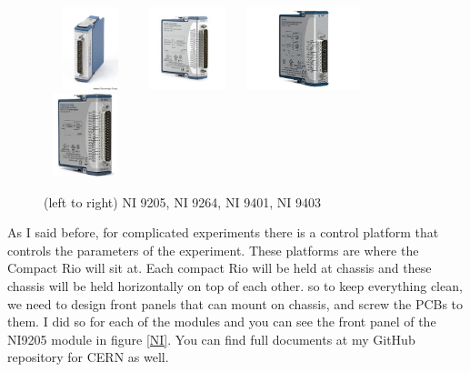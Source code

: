 \documentclass[12pt,a4paper]{article}
\begin{document}
\begin{figure}
\centering
\includegraphics[width=27mm, height=24mm]{ni9205}
\includegraphics[width=27mm, height=24mm]{ni9264}
\includegraphics[width=38mm, height=24mm]{ni9401}
\includegraphics[width=24mm, height=24mm]{ni9403}
\caption{(left to right) NI 9205, NI 9264, NI 9401, NI 9403}
\label{module}
\end{figure}

As I said before, for complicated experiments there is a control platform that controls the parameters of the experiment. 
These platforms are where the Compact Rio will sit at. Each compact Rio will be held at chassis and these chassis will be held horizontally on top of each other. so to keep everything clean, we need to design front panels that can mount on chassis, and screw the PCBs to them. I did so for each of the modules and you can see the front panel of the NI9205 module in figure \ref{NI}. You can find full documents at my GitHub repository for CERN as well.
\end{document}
